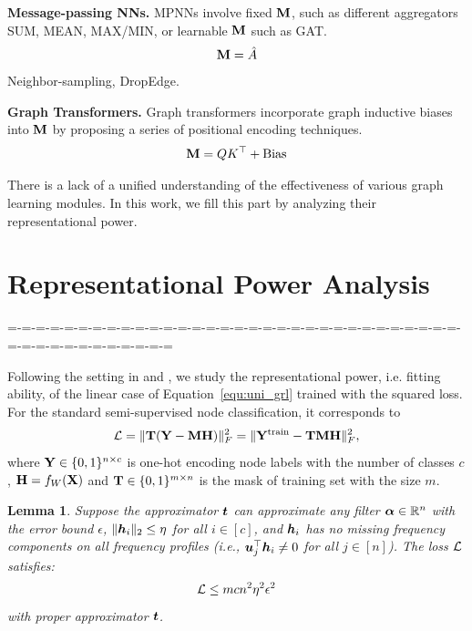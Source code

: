 \documentclass{article} %
\def\valpha{{\bm\alpha}}
\newtheorem{lemma}{\textbf{Lemma}}
\begin{document}
	\textbf{Message-passing NNs.}
	MPNNs involve fixed ${\mathbf{M}}$, such as different aggregators SUM, MEAN, MAX/MIN, or learnable ${\mathbf{M}}$ such as GAT.
	\begin{equation}
		\begin{aligned}
			{\mathbf{M}}=\hat A
		\end{aligned}
	\end{equation}
	Neighbor-sampling, DropEdge.
	
	\textbf{Graph Transformers.}
	Graph transformers incorporate graph inductive biases into ${\mathbf{M}}$ by proposing a series of positional encoding techniques.
	\begin{equation}
		\begin{aligned}
			{\mathbf{M}}=QK^{\top}+\textrm{Bias}
		\end{aligned}
	\end{equation}
	
	There is a lack of a unified understanding of the effectiveness of various graph learning modules.
	In this work, we fill this part by analyzing their representational power.
	
	\section{Representational Power Analysis}
	
	=-=-=-=-=-=-=-=-=-=-=-=-=-=-=-=-=-=-=-=-=-=-=-=-=-=-=-=-=-=-=-=-=-=-=-=-=-=-=-=-=-=-=-=
	
	Following the setting in \citet{xu2021optimization} and \citet{JacobiConv}, we study the representational power, i.e. fitting ability, of the linear case of Equation~\ref{equ:uni_grl} trained with the squared loss.
	For the standard semi-supervised node classification, it corresponds to
	\begin{equation}
		\label{equ:square}
		\begin{aligned}
			{\mathcal{L}}=\|{\mathbf{T}}({\mathbf{Y}}-{\mathbf{M}}{\mathbf{H}})\|^2_F=\|{\mathbf{Y}}^{\textrm{train}}-{\mathbf{T}}{\mathbf{M}}{\mathbf{H}}\|^2_F,
		\end{aligned}
	\end{equation}
	where ${\mathbf{Y}}\in\{0,1\}^{n\times c}$ is one-hot encoding node labels with the number of classes $c$, ${\mathbf{H}}=f_W({\mathbf{X}})$ and ${\mathbf{T}}\in\{0,1\}^{m\times n}$ is the mask of training set with the size $m$.
	
	\begin{lemma}
		\label{prop:loss_bound}
		Suppose the approximator ${\bm{t}}$ can approximate any filter $\valpha\in\sR^n$ with the error bound $\epsilon$, $\|{\bm{h}}_i\|_2\leq\eta$ for all $i\in[c]$, and ${\bm{h}}_i$ has no missing frequency components on all frequency profiles (i.e., ${\bm{u}}_j^{\top}{\bm{h}}_i\neq 0$ for all $j\in[n]$). The loss ${\mathcal{L}}$ satisfies:
		\begin{equation}
			\label{equ:bound}
			\begin{aligned}
				{\mathcal{L}}\leq mcn^2\eta^2\epsilon^2
			\end{aligned}
		\end{equation}
		with proper approximator ${\bm{t}}$.
	\end{lemma}
	
\end{document}
